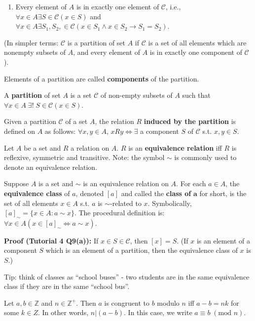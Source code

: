 \documentclass{article}
\begin{document}
\begin{description}
\begin{enumerate}
		\item Every element of $A$ is in exactly one element of $\mathscr{C}$, i.e., $\forall x\in A \exists S \in \mathscr{C} (x\in S)$ and $\forall x\in A \exists S_{1}, S_{2},\in \mathscr{C} (x \in S_{1} \land x\in S_{2} \to S_{1} = S_{2})$.
	\end{enumerate}
	\item \qquad (In simpler terms: $\mathscr{C}$ is a partition of set $A$ if $\mathscr{C}$ is a set of all elements which are nonempty subsets of $A$, and every element of $A$ is in exactly one component of $\mathscr{C}$).
	\item \qquad Elements of a partition are called \textbf{components} of the partition. 
	\item[Partition (shorter definition)] A \textbf{partition} of set $A$ is a set $\mathscr{C}$ of non-empty subsets of $A$ such that $\forall x\in A\; \exists !\;S\in \mathscr{C}(x \in S)$.
	\item[Relation Induced by a Partition] Given a partition $\mathscr{C}$ of a set $A$, the relation $R$ \textbf{induced by the partition} is defined on $A$ as follows: $\forall x,y \in A$, $xRy \Leftrightarrow \exists$ a component $S$ of $\mathscr{C}$ s.t. $x, y\in S$.
	\item[Equivalence Relation]Let $A$ be a set and $R$ a relation on $A$. $R$ is an \textbf{equivalence relation} iff $R$ is reflexive, symmetric and transitive. Note: the symbol $\sim$ is commonly used to denote an equivalence relation.
	\item[Equivalence Class]Suppose $A$ is a set and $\sim$ is an equivalence relation on $A$. For each $a \in A$, the \textbf{equivalence class} of $a$, denoted $[a]$ and called the \textbf{class of} $\mathbf{a}$ for short, is the set of all elements $x \in A$ s.t. $a$ is $\sim$-related to $x$. Symbolically, $[a]_{\sim} = \{x \in A : a\sim x\}$. The procedural definition is: $\forall x\in A (x\in [a]_{\sim} \Leftrightarrow a\sim x)$.
	\item \qquad \textbf{Proof (Tutorial 4 Q9(a)):} If $x\in S\in \mathscr{C}$, then $[x]=S$. (If $x$ is an element of a component $S$ which is an element of a partition, then the equivalence class of $x$ is $S$.)
	\item Tip: think of classes as ``school buses'' - two students are in the same equivalence class if they are in the same ``school bus''.
	\item[Congruence] Let $a, b\in \mathbb{Z}$ and $n\in\mathbb{Z}^{+}$. Then $a$ is congruent to $b$ modulo $n$ iff $a-b=nk$ for some $k\in Z$. In other words, $n|(a-b)$. In this case, we write $a\equiv b\;(\text{mod } n)$.

\end{description}
\end{document}
